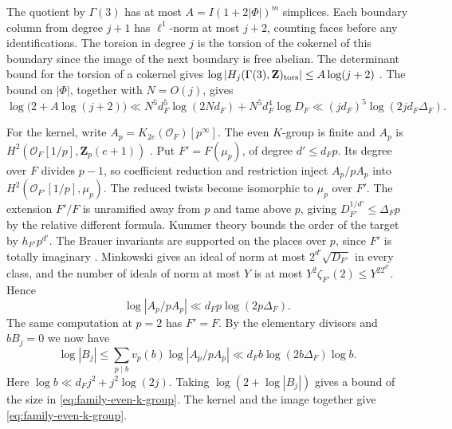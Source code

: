 The quotient by \(\Gamma(3)\) has at most
\(A=I(1+2|\Phi|)^m\) simplices. Each boundary column from degree
\(j+1\) has \(\ell^1\)-norm at most \(j+2\), counting faces before
any identifications. The torsion in degree \(j\) is the torsion of
the cokernel of this boundary since the image of the next boundary
is free abelian. The determinant bound for the torsion of a
cokernel gives \(\log|H_j(\Gamma(3),\mathbf Z)_{\rm tors}|\le
A\log(j+2)\)
\cite[Lemma~3.1]{f1bayer-fluckiger-emery-houriet}.
The bound on \(|\Phi|\), together with \(N=O(j)\), gives
\[
 \log\bigl(2+A\log(j+2)\bigr)
 \ll N^5d_F^5\log(2Nd_F)+N^5d_F^4\log D_F
 \ll (jd_F)^5\log(2jd_F\Delta_F).
\]

For the kernel, write \(A_p=K_{2e}(\mathcal O_F)[p^\infty]\).
The even \(K\)-group is finite and \(A_p\) is
\(H^2(\mathcal O_F[1/p],\mathbf Z_p(e+1))\)
\cite[VI, Theorems~8.2 and~8.4]{f1weibel-kbook}. Put \(F'=F(\mu_p)\), of degree \(d'\le d_Fp\).
Its degree over \(F\) divides \(p-1\), so coefficient reduction
and restriction inject \(A_p/pA_p\) into
\(H^2(\mathcal O_{F'}[1/p],\mu_p)\). The reduced twists become
isomorphic to \(\mu_p\) over \(F'\). The extension \(F'/F\)
is unramified away from \(p\) and tame above \(p\), giving
\(D_{F'}^{1/d'}\le\Delta_F p\) by the relative different formula.
Kummer theory bounds the order of the target by \(h_{F'}p^{d'}\).
The Brauer invariants are supported on the places over \(p\), since
\(F'\) is totally imaginary
\cite[VI, (8.1.1)]{f1weibel-kbook}.
Minkowski gives an ideal of norm at most \(2^{d'}\sqrt{D_{F'}}\)
in every class, and the number of ideals of norm at most \(Y\)
is at most \(Y^2\zeta_{F'}(2)\le Y^22^{d'}\). Hence
\[
 \log|A_p/pA_p|\ll d_Fp\log(2p\Delta_F).
\]
The same computation at \(p=2\) has \(F'=F\). By the elementary
divisors and \(bB_j=0\) we now have
\[
 \log|B_j|
 \le\sum_{p\mid b}v_p(b)\log|A_p/pA_p|
 \ll d_F b\log(2b\Delta_F)\log b .
\]
Here \(\log b\ll d_Fj^2+j^2\log(2j)\). Taking
\(\log(2+\log|B_j|)\) gives a bound of the size in
\eqref{eq:family-even-k-group}. The kernel and the image together
give \eqref{eq:family-even-k-group}.


